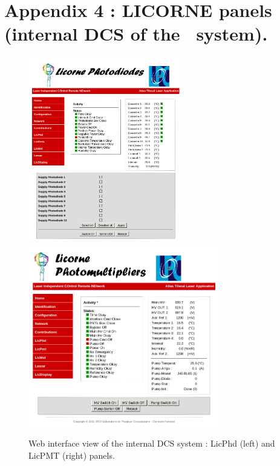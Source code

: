 \newpage

\part*{Appendix 4 : LICORNE panels (internal DCS of the \lasii~system).}
\label{app:d}

\begin{figure}[htbp]
\centering
\includegraphics[height=8cm]{figures/licorne_web1.png}
\includegraphics[height=8cm]{figures/licorne_web2.png}
\caption{Web interface view of the internal DCS system : LicPhd (left) and LicPMT (right) panels.}\label{fig:licorne_weba}
\end{figure}

